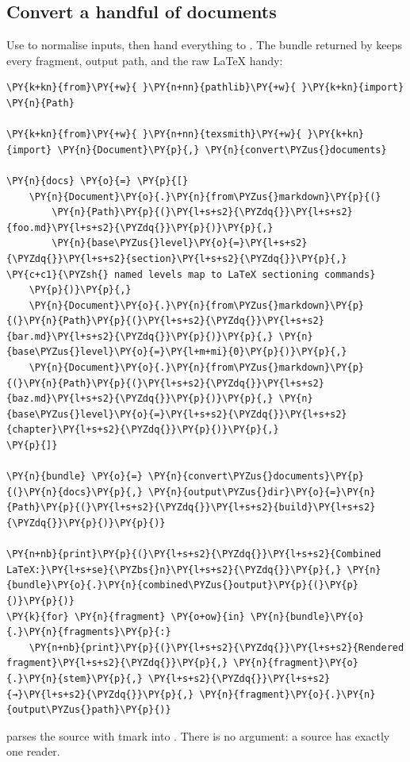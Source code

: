 \documentclass[a4paper,twoside]{article}
\begin{document}
\subsection{Convert a handful of documents}
Use  to normalise inputs, then hand everything to . The bundle returned by  keeps every fragment, output path, and the raw \LaTeX{} handy:
\begin{tscode}[lang=python, engine=pygments]
\begin{Verbatim}[commandchars=\\\{\},breaklines, breakanywhere, commandchars=\\\{\}]
\PY{k+kn}{from}\PY{+w}{ }\PY{n+nn}{pathlib}\PY{+w}{ }\PY{k+kn}{import} \PY{n}{Path}

\PY{k+kn}{from}\PY{+w}{ }\PY{n+nn}{texsmith}\PY{+w}{ }\PY{k+kn}{import} \PY{n}{Document}\PY{p}{,} \PY{n}{convert\PYZus{}documents}

\PY{n}{docs} \PY{o}{=} \PY{p}{[}
    \PY{n}{Document}\PY{o}{.}\PY{n}{from\PYZus{}markdown}\PY{p}{(}
        \PY{n}{Path}\PY{p}{(}\PY{l+s+s2}{\PYZdq{}}\PY{l+s+s2}{foo.md}\PY{l+s+s2}{\PYZdq{}}\PY{p}{)}\PY{p}{,}
        \PY{n}{base\PYZus{}level}\PY{o}{=}\PY{l+s+s2}{\PYZdq{}}\PY{l+s+s2}{section}\PY{l+s+s2}{\PYZdq{}}\PY{p}{,}  \PY{c+c1}{\PYZsh{} named levels map to LaTeX sectioning commands}
    \PY{p}{)}\PY{p}{,}
    \PY{n}{Document}\PY{o}{.}\PY{n}{from\PYZus{}markdown}\PY{p}{(}\PY{n}{Path}\PY{p}{(}\PY{l+s+s2}{\PYZdq{}}\PY{l+s+s2}{bar.md}\PY{l+s+s2}{\PYZdq{}}\PY{p}{)}\PY{p}{,} \PY{n}{base\PYZus{}level}\PY{o}{=}\PY{l+m+mi}{0}\PY{p}{)}\PY{p}{,}
    \PY{n}{Document}\PY{o}{.}\PY{n}{from\PYZus{}markdown}\PY{p}{(}\PY{n}{Path}\PY{p}{(}\PY{l+s+s2}{\PYZdq{}}\PY{l+s+s2}{baz.md}\PY{l+s+s2}{\PYZdq{}}\PY{p}{)}\PY{p}{,} \PY{n}{base\PYZus{}level}\PY{o}{=}\PY{l+s+s2}{\PYZdq{}}\PY{l+s+s2}{chapter}\PY{l+s+s2}{\PYZdq{}}\PY{p}{)}\PY{p}{,}
\PY{p}{]}

\PY{n}{bundle} \PY{o}{=} \PY{n}{convert\PYZus{}documents}\PY{p}{(}\PY{n}{docs}\PY{p}{,} \PY{n}{output\PYZus{}dir}\PY{o}{=}\PY{n}{Path}\PY{p}{(}\PY{l+s+s2}{\PYZdq{}}\PY{l+s+s2}{build}\PY{l+s+s2}{\PYZdq{}}\PY{p}{)}\PY{p}{)}

\PY{n+nb}{print}\PY{p}{(}\PY{l+s+s2}{\PYZdq{}}\PY{l+s+s2}{Combined LaTeX:}\PY{l+s+se}{\PYZbs{}n}\PY{l+s+s2}{\PYZdq{}}\PY{p}{,} \PY{n}{bundle}\PY{o}{.}\PY{n}{combined\PYZus{}output}\PY{p}{(}\PY{p}{)}\PY{p}{)}
\PY{k}{for} \PY{n}{fragment} \PY{o+ow}{in} \PY{n}{bundle}\PY{o}{.}\PY{n}{fragments}\PY{p}{:}
    \PY{n+nb}{print}\PY{p}{(}\PY{l+s+s2}{\PYZdq{}}\PY{l+s+s2}{Rendered fragment}\PY{l+s+s2}{\PYZdq{}}\PY{p}{,} \PY{n}{fragment}\PY{o}{.}\PY{n}{stem}\PY{p}{,} \PY{l+s+s2}{\PYZdq{}}\PY{l+s+s2}{→}\PY{l+s+s2}{\PYZdq{}}\PY{p}{,} \PY{n}{fragment}\PY{o}{.}\PY{n}{output\PYZus{}path}\PY{p}{)}
\end{Verbatim}
\end{tscode}
 parses the source with tmark into . There is no
 argument: a source has exactly one reader.
\end{document}
